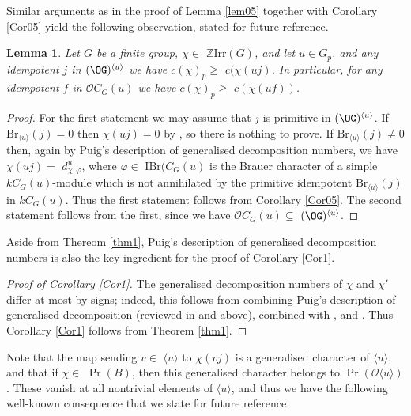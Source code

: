 \documentclass{amsart} %
\theoremstyle{plain}\newtheorem{Theorem}{Theorem}[section]
\theoremstyle{plain}\newtheorem{Conjecture}[Theorem]{Conjecture}
\theoremstyle{plain}\newtheorem{Corollary}[Theorem]{Corollary}
\theoremstyle{plain}\newtheorem{Lemma}[Theorem]{Lemma}
\theoremstyle{plain}\newtheorem{Proposition}[Theorem]{Proposition}
\theoremstyle{definition}\newtheorem{Definition}[Theorem]{Definition}
\theoremstyle{definition}\newtheorem{Example}[Theorem]{Example}
\theoremstyle{definition}\newtheorem{Examples}[Theorem]{Examples}
\theoremstyle{definition}\newtheorem{Remark}[Theorem]{Remark}
\theoremstyle{definition}\newtheorem{Remarks}[Theorem]{Remarks}
\theoremstyle{plain}\newtheorem{Statement}[Theorem]{}
\def\CO{{\mathcal{O}}}
\def\Z{{\mathbb Z}}
\def\Br{\mathrm{Br}}             \def\ten{\otimes}
\def\IBr{\mathrm{IBr}}
\def\Irr{\mathrm{Irr}}           \def\tenK{\otimes_K}
\begin{document}
Similar arguments as in the proof of Lemma \ref{lem05} together  
with Corollary \ref{Cor05} yield the following
observation, stated for future reference.

\begin{Lemma} \label{lem01}
Let $G$ be a finite group, $\chi\in$ $\Z\Irr(G)$, and let  $u\in G_p$.
and any idempotent $j$ in $(\OG)^{\langle u\rangle}$ we have
$c(\chi)_p\geq$ $c(\chi(uj)$. In particular, for any idempotent
$f$ in $\CO C_G(u)$ we have $c(\chi)_p\geq$ $c(\chi(uf))$.
\end{Lemma}

\begin{proof}
For the first statement
we may assume that $j$ is primitive in $(\OG)^{\langle u\rangle}$.
If $\Br_{\langle u\rangle}(j)=0$ then $\chi(uj)=0$ by \cite[Theorem 5.16.12]{LiBookI},
so there is nothing to prove. If $\Br_{\langle u\rangle}(j)\neq 0$ then, again by
Puig's description of generalised decomposition numbers, we have  
$\chi(uj)=$ $d^u_{\chi,\varphi}$, where $\varphi\in$ $\IBr(C_G(u)$ is the Brauer
character of a simple $kC_G(u)$-module which is not annihilated by the
primitive idempotent $\Br_{\langle u\rangle}(j)$ in $kC_G(u)$. Thus the
first statement follows from Corollary \ref{Cor05}. The second statement follows
from the first, since we have $\CO C_G(u)\subseteq$ $(\OG)^{\langle u\rangle}$.
\end{proof}




Aside from Thereom \ref{thm1}, Puig's description of generalised decomposition 
numbers is also the key ingredient for the proof of Corollary \ref{Cor1}. 

\begin{proof}[{Proof of Corollary \ref{Cor1}}]
The generalised decomposition numbers of $\chi$ and $\chi'$ differ at most by
signs; indeed, this follows from combining Puig's description of generalised
decomposition (reviewed in \cite[Theorem 5.15.3]{LiBookI} and above), combined with
\cite[Theorem 7.4.3]{LiBookII}, and \cite[Theorem 9.11.9]{LiBookII}.
Thus Corollary \ref{Cor1} follows from Theorem \ref{thm1}.
\end{proof}


Note that the map sending $v\in$ $\langle u\rangle$ to $\chi(vj)$ is a generalised
character of $\langle u\rangle$, and that if $\chi\in$ $\Pr(B)$,  then this
generalised character belongs to $\Pr(\CO\langle u\rangle)$. These vanish
at all nontrivial elements of $\langle u\rangle$, and thus we have the following
 well-known  consequence that we state for future reference.
\end{document}
